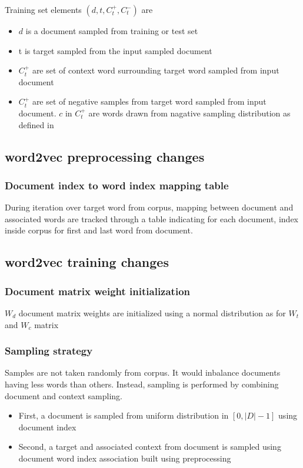 \documentclass[a4paper]{article}
\begin{document}
Training set elements $(d,t,C_{t}^{+},C_{t}^{-})$ are
\begin{itemize}
\item $d$ is a document sampled from training or test set
\item t is target sampled from the input sampled document
\item $C_{t}^{+}$ are set of context word surrounding target word sampled from input document
\item $C_{t}^{+}$ are set of negative samples from target word sampled from input document. $c$ in $C_{t}^{+}$ are words drawn from nagative sampling distribution as defined in \citep{quocLe2014doc2vec}
\end{itemize}


\subsection{word2vec preprocessing changes}


\subsubsection{Document index to word index mapping table}

During iteration over target word from corpus, mapping between document and associated words are tracked through a table indicating for each document, index inside corpus for first and last word from document.


\subsection{word2vec training changes}

\subsubsection{Document matrix weight initialization}
$W_{d}$ document matrix weights are initialized using a normal distribution as for $W_{t}$ and $W_{c}$ matrix

\subsubsection{Sampling strategy}
Samples are not taken randomly from corpus. It would inbalance documents having less words than others. Instead, sampling is performed by combining document and context sampling.
\begin{itemize}
\item First, a document is sampled from uniform distribution in $[0, \vert D \vert - 1]$ using document index
\item Second, a target and associated context from document is sampled using document word index association built using preprocessing
\end{itemize}
\end{document}
